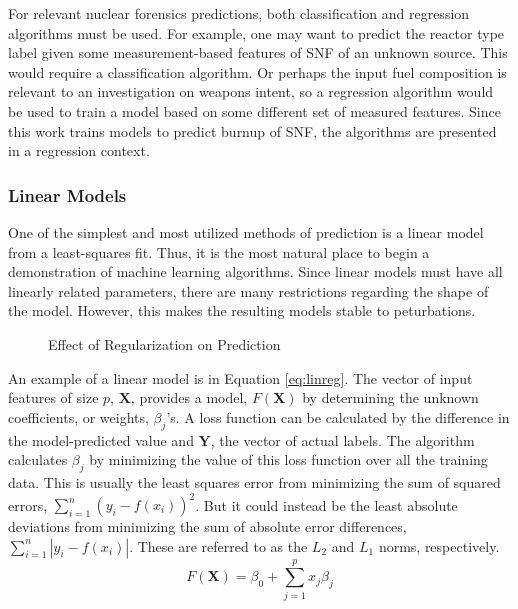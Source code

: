 \setlength\abovedisplayskip{2.5pt}

For relevant nuclear forensics predictions, both classification and regression
algorithms must be used.  For example, one may want to predict the reactor type
label given some measurement-based features of \gls{SNF} of an unknown source.
This would require a classification algorithm. Or perhaps the input fuel
composition is relevant to an investigation on weapons intent, so a regression
algorithm would be used to train a model based on some different set of
measured features. Since this work trains models to predict burnup of
\gls{SNF}, the algorithms are presented in a regression context.

\subsubsection{Linear Models}
\label{sec:linear}

One of the simplest and most utilized methods of prediction is a linear model
from a least-squares fit. Thus, it is the most natural place to begin a
demonstration of machine learning algorithms. Since linear models must have all
linearly related parameters, there are many restrictions regarding the shape of
the model. However, this makes the resulting models stable to peturbations.
\cite{changingml}

\begin{figure}[!htb]
  \caption{Effect of Regularization on Prediction}
  \label{fig:reg}
\end{figure}

An example of a linear model is in Equation \ref{eq:linreg}. The vector of
input features of size $p$, $\boldsymbol{X}$, provides a model,
$F(\boldsymbol{X})$ by determining the unknown coefficients, or weights,
$\beta_{j}$'s. A loss function can be calculated by the difference in the
model-predicted value and $\boldsymbol{Y}$, the vector of actual labels.  The
algorithm calculates $\beta_{j}$ by minimizing the value of this loss function
over all the training data.  This is usually the least squares error from
minimizing the sum of squared errors, $\sum_{i=1}^{n} (y_i - f(x_i))^2$.  But
it could instead be the least absolute deviations from minimizing the sum of
absolute error differences, $\sum_{i=1}^{n} |y_i - f(x_i)|$. These are referred
to as the $L_2$ and $L_1$ norms, respectively.  
\begin{equation}
  F(\boldsymbol{X}) = \beta_{0} +  \sum_{j=1}^{p} x_{j} \beta_{j}
  \label{eq:linreg}
\end{equation}

